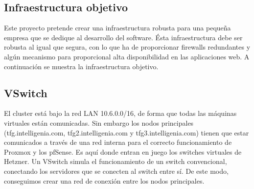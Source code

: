         \subsection{Infraestructura objetivo}
                \begin{text}
                        Este proyecto pretende crear una infraestructura robusta para una pequeña empresa que se dedique al desarrollo del software. Ésta infraestructura debe ser robusta al igual que segura, con lo que ha de proporcionar firewalls redundantes y algún mecanismo para proporcional alta disponibilidad en las aplicaciones web.  A continuación se muestra la infraestructura objetivo.
                \end{text}

        \subsection{VSwitch}
        \begin{text}
                El cluster está bajo la red LAN 10.6.0.0/16, de forma que todas las máquinas virtuales están comunicadas. Sin embargo los nodos principales (tfg.intelligenia.com, tfg2.intelligenia.com y tfg3.intelligenia.com) tienen que estar comunicados a través de una red interna para el correcto funcionamiento de Proxmox y los pfSense.
                Es aquí donde entran en juego los switches virtuales de Hetzner. Un VSwitch simula el funcionamiento de un switch convencional, conectando los servidores que se conecten al switch entre sí. De este modo, conseguimos crear una red de conexión entre los nodos principales.
        \end{text}

